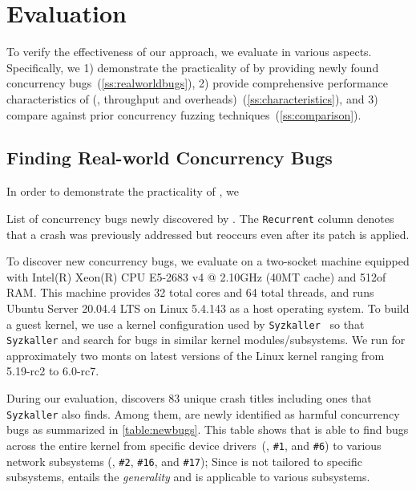 \section{Evaluation}
\label{s:eval}

To verify the effectiveness of our approach, we evaluate \sys in
various aspects.
%
Specifically, we 1) demonstrate the practicality of
\sys by providing newly found concurrency
bugs~(\autoref{ss:realworldbugs}),
%
2) provide comprehensive performance characteristics of \sys (\eg,
throughput and overheads)~(\autoref{ss:characteristics}), and
%
3) compare \sys against prior concurrency fuzzing
techniques~(\autoref{ss:comparison}).

\subsection{Finding Real-world Concurrency Bugs}
\label{ss:realworldbugs}

In order to demonstrate the practicality of \sys, we 

\begin{table*}[t]
  
  \centering
  \caption{List of concurrency bugs newly discovered by \sys. The
    \texttt{Recurrent} column denotes that a crash was previously
    addressed but reoccurs even after its patch is applied.}
  \label{table:newbugs}
\end{table*}

%
To discover new concurrency bugs, we evaluate \sys on a two-socket
machine equipped with Intel(R) Xeon(R) CPU E5-2683 v4 @ 2.10GHz (40MT
cache) and 512\GB of RAM.
%
This machine provides 32 total cores and 64 total threads, and runs
Ubuntu Server 20.04.4 LTS on Linux 5.4.143 as a host operating system.
%
To build a guest kernel, we use a kernel configuration used by
\texttt{Syzkaller}~\cite{syzkaller} so that \texttt{Syzkaller} and
\sys search for bugs in similar kernel modules/subsystems.
%
We run \sys for approximately two monts on latest versions of the
Linux kernel ranging from 5.19-rc2 to 6.0-rc7.


%
During our evaluation, \sys discovers 83 unique crash titles including
ones that \texttt{Syzkaller} also finds. Among them, \totalbugs are
newly identified as harmful concurrency bugs as summarized in
\autoref{table:newbugs}.
%
This table shows that \sys is able to find bugs across the entire
kernel from specific device drivers~(\eg, \texttt{\#1}, and
\texttt{\#6}) to various network subsystems (\eg, \texttt{\#2},
\texttt{\#16}, and \texttt{\#17}); Since \sys is not tailored to
specific subsystems, \sys entails the \textit{generality} and is
applicable to various subsystems.

